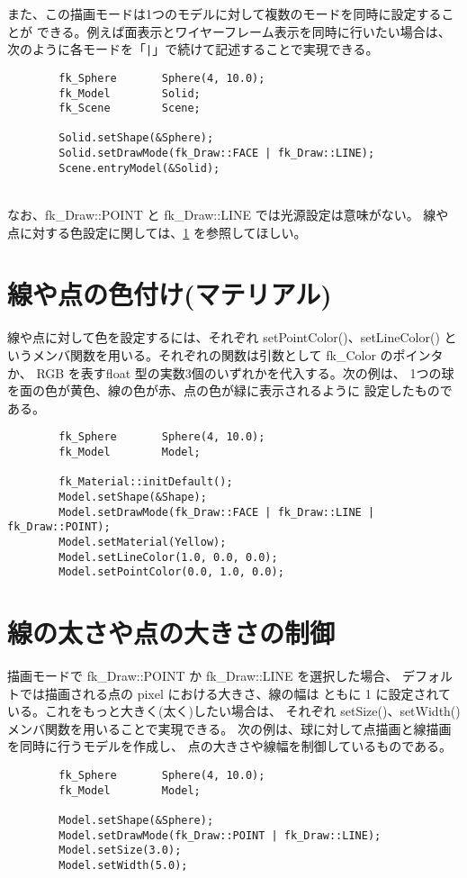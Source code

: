 また、この描画モードは1つのモデルに対して複数のモードを同時に設定することが
できる。例えば面表示とワイヤーフレーム表示を同時に行いたい場合は、
次のように各モードを「\verb+|+」で続けて記述することで実現できる。
\\
\begin{breakbox}
\begin{verbatim}
        fk_Sphere       Sphere(4, 10.0);
        fk_Model        Solid;
        fk_Scene        Scene;

        Solid.setShape(&Sphere);
        Solid.setDrawMode(fk_Draw::FACE | fk_Draw::LINE);
        Scene.entryModel(&Solid);
\end{verbatim}
\end{breakbox}
~ \\
なお、fk\_Draw::POINT と fk\_Draw::LINE では光源設定は意味がない。
線や点に対する色設定に関しては、\ref{sec:pointlinemat} を参照してほしい。

\section{線や点の色付け(マテリアル)} \label{sec:pointlinemat}
線や点に対して色を設定するには、それぞれ setPointColor()、setLineColor()
というメンバ関数を用いる。それぞれの関数は引数として fk\_Color のポインタか、
RGB を表すfloat 型の実数3個のいずれかを代入する。次の例は、
1つの球を面の色が黄色、線の色が赤、点の色が緑に表示されるように
設定したものである。
\\
\begin{breakbox}
\begin{verbatim}
        fk_Sphere       Sphere(4, 10.0);
        fk_Model        Model;

        fk_Material::initDefault();
        Model.setShape(&Shape);
        Model.setDrawMode(fk_Draw::FACE | fk_Draw::LINE | fk_Draw::POINT);
        Model.setMaterial(Yellow);     
        Model.setLineColor(1.0, 0.0, 0.0);
        Model.setPointColor(0.0, 1.0, 0.0);
\end{verbatim}
\end{breakbox}

\section{線の太さや点の大きさの制御} \label{sec:widthsize}
描画モードで fk\_Draw::POINT か fk\_Draw::LINE を選択した場合、
デフォルトでは描画される点の pixel における大きさ、線の幅は
ともに 1 に設定されている。これをもっと大きく(太く)したい場合は、
それぞれ setSize()、setWidth() メンバ関数を用いることで実現できる。
次の例は、球に対して点描画と線描画を同時に行うモデルを作成し、
点の大きさや線幅を制御しているものである。
\\
\begin{breakbox}
\begin{verbatim}
        fk_Sphere       Sphere(4, 10.0);
        fk_Model        Model;

        Model.setShape(&Sphere);
        Model.setDrawMode(fk_Draw::POINT | fk_Draw::LINE);
        Model.setSize(3.0);
        Model.setWidth(5.0);
\end{verbatim}
\end{breakbox}


